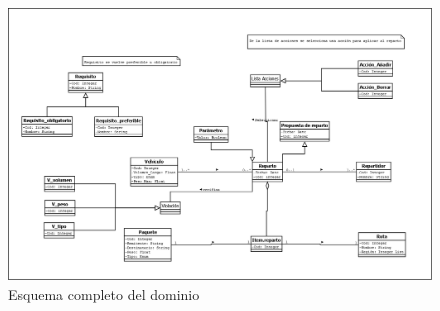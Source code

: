 \begin{figure}[H]
  \centering
  \includegraphics[scale=0.25,angle=90]{imaxes/Diagrama_Dominio_Completo.png}
  \caption{\label{fig:DominioCompleto}Esquema completo del dominio}
\end{figure}
